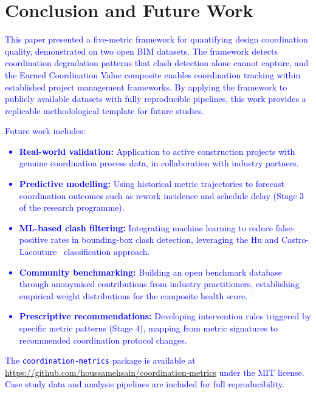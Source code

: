 \documentclass[conference]{IEEEtran}
\newcommand{\placeholder}[1]{\textcolor{blue}{#1}}
\begin{document}
\section{Conclusion and Future Work}

\placeholder{
This paper presented a five-metric framework for quantifying design coordination quality, demonstrated on two open BIM datasets. The framework detects coordination degradation patterns that clash detection alone cannot capture, and the Earned Coordination Value composite enables coordination tracking within established project management frameworks. By applying the framework to publicly available datasets with fully reproducible pipelines, this work provides a replicable methodological template for future studies.

Future work includes:
\begin{itemize}
    \item \textbf{Real-world validation:} Application to active construction projects with genuine coordination process data, in collaboration with industry partners.
    \item \textbf{Predictive modelling:} Using historical metric trajectories to forecast coordination outcomes such as rework incidence and schedule delay (Stage 3 of the research programme).
    \item \textbf{ML-based clash filtering:} Integrating machine learning to reduce false-positive rates in bounding-box clash detection, leveraging the Hu and Castro-Lacouture~\cite{hu2019} classification approach.
    \item \textbf{Community benchmarking:} Building an open benchmark database through anonymised contributions from industry practitioners, establishing empirical weight distributions for the composite health score.
    \item \textbf{Prescriptive recommendations:} Developing intervention rules triggered by specific metric patterns (Stage 4), mapping from metric signatures to recommended coordination protocol changes.
\end{itemize}

The \texttt{coordination-metrics} package is available at \url{https://github.com/houssamehsain/coordination-metrics} under the MIT license. Case study data and analysis pipelines are included for full reproducibility.
}

\appendices
\end{document}
